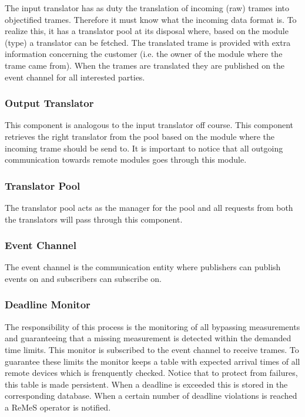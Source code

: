 \npar The input translator has as duty the translation of incoming (raw) trames
into objectified trames. Therefore it must know what the incoming data format
is. To realize this, it has a translator pool at its disposal where, based on
the module (type) a translator can be fetched. The translated trame is provided
with extra information concerning the customer (i.e. the owner of the module where the
trame came from). When the trames are translated they are published on the event
channel for all interested parties.

\subsubsection{Output Translator}

\npar This component is analogous to the input translator off course. This
component retrieves the right translator from the pool based on the module
where the incoming trame should be send to. It is important to notice that all
outgoing communication towards remote modules goes through this module.

\subsubsection{Translator Pool}

\npar The translator pool acts as the manager for the pool and all requests from
both the translators will pass through this component. 

\subsubsection{Event Channel}

\npar The event channel is the communication entity where publishers can publish
events on and subscribers can subscribe on.

\subsubsection{Deadline Monitor}

\npar The responsibility of this process is the monitoring of all bypassing
measurements and guaranteeing that a missing measurement is detected within the
demanded time limits. This monitor is subscribed to the event channel to receive
trames. To guarantee these limits the monitor keeps a table with expected
arrival times of all remote devices which is frenquently checked. Notice that to
protect from failures, this table is made persistent. When a deadline is
exceeded this is stored in the corresponding database. When a certain number of
deadline violations is reached a ReMeS operator is notified.

